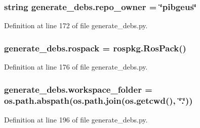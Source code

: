 \subsubsection[{\texorpdfstring{repo\+\_\+owner}{repo_owner}}]{\setlength{\rightskip}{0pt plus 5cm}string generate\+\_\+debs.\+repo\+\_\+owner = \char`\"{}pibgeus\char`\"{}}\hypertarget{namespacegenerate__debs_adec04970ffa308e6dec7d8e42f63fc55}{}\label{namespacegenerate__debs_adec04970ffa308e6dec7d8e42f63fc55}


Definition at line 172 of file generate\+\_\+debs.\+py.

\subsubsection[{\texorpdfstring{rospack}{rospack}}]{\setlength{\rightskip}{0pt plus 5cm}generate\+\_\+debs.\+rospack = rospkg.\+Ros\+Pack()}\hypertarget{namespacegenerate__debs_a609fa33c1ebbff173ec90524eeb7b49d}{}\label{namespacegenerate__debs_a609fa33c1ebbff173ec90524eeb7b49d}


Definition at line 176 of file generate\+\_\+debs.\+py.

\subsubsection[{\texorpdfstring{workspace\+\_\+folder}{workspace_folder}}]{\setlength{\rightskip}{0pt plus 5cm}generate\+\_\+debs.\+workspace\+\_\+folder = os.\+path.\+abspath(os.\+path.\+join(os.\+getcwd(), \char`\"{}.\char`\"{}))}\hypertarget{namespacegenerate__debs_acb69863b90257249a30e43ebacfb8bd8}{}\label{namespacegenerate__debs_acb69863b90257249a30e43ebacfb8bd8}


Definition at line 196 of file generate\+\_\+debs.\+py.

